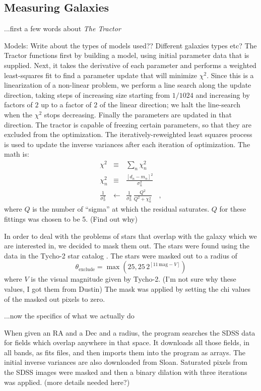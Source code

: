 \documentclass[12pt,preprint,pdftex]{aastex}
\newcommand{\project}[1]{\textsl{#1}}
\newcommand{\units}[1]{\mathrm{#1}}
\renewcommand{\mag}{\units{mag}}
\begin{document}
\subsection{Measuring Galaxies}

...first a few words about \project{The Tractor}

Models: Write about the types of models used?? Different galaxies types etc?
The Tractor functions first by building a model, using initial parameter data that is supplied. Next, it takes the derivative of each parameter and performs a weighted least-squares fit to find a parameter update that will minimize $\chi^2$.  Since this is a linearization of a non-linear problem, we perform a line search along the update direction, taking steps of increasing size starting from $1/1024$ and increasing by factors of $2$ up to a factor of $2$ of the linear direction; we halt the line-search when the $\chi^2$ stops decreasing.  Finally the parameters are updated in that direction. The tractor is capable of freezing certain parameters, so that they are excluded from the optimization. 
The iteratively-reweighted least squares process is used to update the
inverse variances after each iteration of optimization. The math is:
\begin{eqnarray}
\chi^2 &\equiv& \sum_n \chi_n^2
\\
\chi_n^2 &\equiv& \frac{[d_n - m_n]^2}{\sigma_n^2}
\\
\frac{1}{\sigma_n^2} &\leftarrow& \frac{1}{\sigma_n^2}\,\frac{Q^2}{Q^2+\chi_n^2}
\quad ,
\end{eqnarray}
where $Q$ is the number of ``sigma'' at which the residual saturates. $Q$ for these fittings was chosen to be 5. (Find out why)

In order to deal with the problems of stars that overlap with the
galaxy which we are interested in, we decided to mask them out. The
stars were found using the data in the Tycho-2 star catalog \citep{tycho2}.
The stars were masked out to a
radius of
\begin{equation}
\theta_{\mathrm{exclude}} = \max(25, 25\,2^{[11\,\mag-V]})
\end{equation}
where $V$ is the visual magnitude given by Tycho-2.
(I'm not sure why these values, I got them from Dustin) The mask was applied by setting the chi values of the masked out pixels to zero.



...now the specifics of what we actually do

When given an RA and a Dec and a radius, the program searches the SDSS data for fields which overlap anywhere in that space. It downloads all those fields, in all bands, as fits files, and then imports them into the program as arrays. The initial inverse variances are also downloaded from Sloan.
Saturated pixels from the SDSS images were masked and then a binary dilation with three iterations was applied. (more details needed here?)
\end{document}
